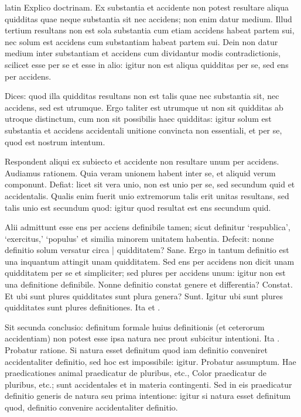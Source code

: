 \begin{otherlanguage*}{latin}
\pstart
  Explico doctrinam. Ex substantia et accidente non potest resultare aliqua quidditas quae neque substantia sit nec accidens; non enim datur medium. Illud tertium resultans non est sola substantia cum etiam accidens habeat partem sui, nec solum est accidens cum substantiam habeat partem sui. Dein non datur medium inter substantiam et accidens cum dividantur modis contradictionis, scilicet esse per se et esse in alio: igitur non est aliqua quidditas per se, sed ens per accidens. 
\pend

\pstart
  Dices: quod illa quidditas resultans non est talis quae nec substantia sit, nec accidens, sed est utrumque. Ergo taliter est utrumque ut non sit quidditas ab utroque distinctum, cum non sit possibilis haec quidditas: igitur solum est substantia et accidens accidentali unitione convincta non essentiali, et per se, quod est nostrum intentum. 
\pend

\pstart
  Respondent aliqui ex subiecto et accidente non resultare unum per accidens. Audiamus rationem. Quia veram unionem habent inter se, et aliquid verum componunt. Defiat: licet sit vera unio, non est unio per se, sed secundum quid et accidentalis. Qualis enim fuerit unio extremorum talis erit unitas resultans, sed talis unio est secundum quod: igitur quod resultat est ens secundum quid. 
\pend

\pstart
  Alii admittunt esse ens per acciens definibile tamen; sicut definitur `respublica', `exercitus,' `populus' et similia minorem unitatem habentia. Defecit: nonne definitio solum versatur circa \textnormal{|} quidditatem? Sane. Ergo in tantum definitio est una inquantum attingit unam quidditatem. Sed ens per accidens non dicit unam quidditatem per se et simpliciter; sed plures per accidens unum: igitur non est una definitione definibile. Nonne definitio constat genere et differentia? Constat. Et ubi sunt plures quidditates sunt plura genera? Sunt. Igitur ubi sunt plures quidditates sunt plures definitiones. Ita  et . 
\pend

\pstart
  Sit secunda conclusio: definitum formale huius definitionis (et ceterorum accidentiam) non potest esse ipsa natura nec prout subicitur intentioni. Ita . Probatur ratione. Si natura esset definitum quod iam definitio conveniret accidentaliter definitio, sed hoc est impossibile: igitur. Probatur assumptum. Hae praedicationes animal praedicatur de pluribus, etc., Color praedicatur de pluribus, etc.; sunt accidentales et in materia contingenti. Sed in eis praedicatur definitio generis de natura seu prima intentione: igitur si natura esset definitum quod, definitio convenire accidentaliter definitio. 
\pend


\end{otherlanguage*}
